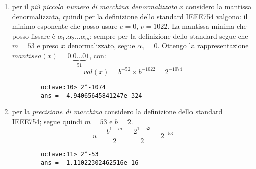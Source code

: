 \begin{enumerate}
	\item per il \emph{pi\`u piccolo numero di macchina denormalizzato} $x$ considero la 
	mantissa denormalizzata,
	quindi per la definizione dello standard IEEE754 valgono: il minimo esponente che posso
	usare $e = 0$, $\nu = 1022$.
	La mantissa minima che posso fissare \`e $\alpha_{1}.\alpha_{2} \ldots \alpha_{m}$:
	sempre per la definizione dello standard segue che $m = 53$ e preso $x$ denormalizzato,
	segue $\alpha_{1} = 0$. Ottengo la rappresentazione 
		$mantissa(x) = 0.\underbrace{0 \ldots 0}_{51} 1$, con:
	\begin{displaymath}
		val(x) = b^{-52} \times b^{-1022} = 2^{-1074}
	\end{displaymath}
	\begin{lstlisting}
		octave:10> 2^-1074
		ans =  4.94065645841247e-324
	\end{lstlisting}
	
	\item per la \emph{precisione di macchina} considero la definizione dello 
		standard IEEE754; segue quindi  $m = 53$ e $b = 2$.
	\begin{displaymath}
		u = \frac{b^{1-m}}{2} = \frac{2^{1-53}}{2} = 2^{-53}
	\end{displaymath}
	\begin{lstlisting}
		octave:11> 2^-53
		ans =  1.11022302462516e-16
	\end{lstlisting}

\end{enumerate}


